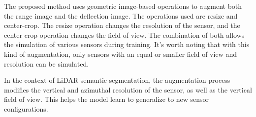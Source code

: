 The proposed method uses geometric image-based operations to augment both the range image and the deflection image. The operations used are resize and center-crop. The resize operation changes the resolution of the sensor, and the center-crop operation changes the field of view. The combination of both allows the simulation of various sensors during training. It's worth noting that with this kind of augmentation, only sensors with an equal or smaller field of view and resolution can be simulated.

In the context of LiDAR semantic segmentation, the augmentation process modifies the vertical and azimuthal resolution of the sensor, as well as the vertical field of view. This helps the model learn to generalize to new sensor configurations.

